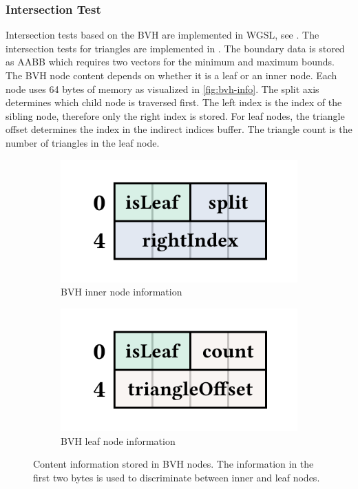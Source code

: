 \subsubsection{Intersection Test}
\label{sec:bvh-implementation}

Intersection tests based on the \gls{BVH} are implemented in \gls{WGSL}, see . The intersection tests for triangles are implemented in . The boundary data is stored as \gls{AABB} which requires two vectors for the minimum and maximum bounds. The \gls{BVH} node content depends on whether it is a leaf or an inner node. Each node uses 64 bytes of memory as visualized in \autoref{fig:bvh-info}. The split axis determines which child node is traversed first. The left index is the index of the sibling node, therefore only the right index is stored. For leaf nodes, the triangle offset determines the index in the indirect indices buffer. The triangle count is the number of triangles in the leaf node.

\begin{figure}[H]
    \centering
    \begin{subfigure}[b]{0.45\textwidth}
        \includegraphics[width=\textwidth]{resources/bvh-node-info.png}
        \caption{\gls{BVH} inner node information}
        \label{fig:bvh-info-inner-node}
    \end{subfigure}
    \hfill
    \begin{subfigure}[b]{0.45\textwidth}
        \includegraphics[width=\textwidth]{resources/bvh-leaf-info.png}
        \caption{\gls{BVH} leaf node information}
        \label{fig:bvh-info-leaf-node}
    \end{subfigure}
    \caption{Content information stored in \gls{BVH} nodes. The information in the first two bytes is used to discriminate between inner and leaf nodes.}
    \label{fig:bvh-info}
\end{figure}

